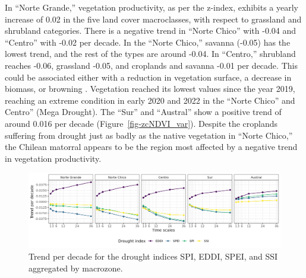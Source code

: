 \documentclass[
  authoryear,
  preprint,
  3p,
  onecolumn]{elsarticle}
\begin{document}
In ``Norte Grande,'' vegetation productivity, as per the z-index,
exhibits a yearly increase of 0.02 in the five land cover macroclasses,
with respect to grassland and shrubland categories. There is a negative
trend in ``Norte Chico'' with -0.04 and ``Centro'' with -0.02 per
decade. In the ``Norte Chico,'' savanna (-0.05) has the lowest trend,
and the rest of the types are around -0.04. In ``Centro,'' shrubland
reaches -0.06, grassland -0.05, and croplands and savanna -0.01 per
decade. This could be associated either with a reduction in vegetation
surface, a decrease in biomass, or browning \citep{Miranda2023}.
Vegetation reached its lowest values since the year 2019, reaching an
extreme condition in early 2020 and 2022 in the ``Norte Chico'' and
Centro'' (Mega Drought). The ``Sur'' and ``Austral'' show a positive
trend of around 0.016 per decade (Figure~\ref{fig-zcNDVI_var}). Despite
the croplands suffering from drought just as badly as the native
vegetation in ``Norte Chico,'' the Chilean matorral \citep{Fuentes2021}
appears to be the region most affected by a negative trend in vegetation
productivity.

\begin{figure}[!ht]

{\centering \includegraphics{../output/figs/trend_macrozone_drought_indices.png}

}

\caption{\label{fig-trendDIMacro}Trend per decade for the drought
indices SPI, EDDI, SPEI, and SSI aggregated by macrozone.}

\end{figure}

\blandscape
\end{document}
